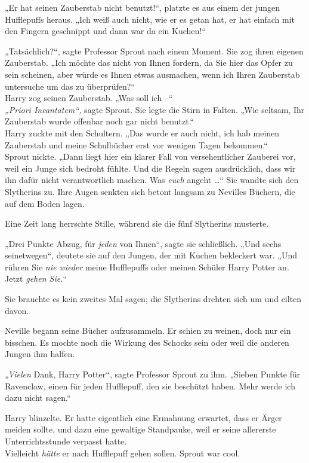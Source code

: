 {„Er hat seinen Zauberstab nicht benutzt!“, platzte es aus einem der jungen Hufflepuffs heraus. „Ich weiß auch nicht, wie er es getan hat, er hat einfach mit den Fingern geschnippt und dann war da ein Kuchen!“

„Tatsächlich?“, sagte Professor Sprout nach einem Moment. Sie zog ihren eigenen Zauberstab. „Ich möchte das nicht von Ihnen fordern, da Sie hier das Opfer zu sein scheinen, aber würde es Ihnen etwas ausmachen, wenn ich Ihren Zauberstab untersuche um das zu überprüfen?“\\ Harry zog seinen Zauberstab. „Was soll ich --“\\ \emph{„Priori Incantatem“,} sagte Sprout. Sie legte die Stirn in Falten. „Wie seltsam, Ihr Zauberstab wurde offenbar noch gar nicht benutzt.“\\ Harry zuckte mit den Schultern. „Das wurde er auch nicht, ich hab meinen Zauberstab und meine Schulbücher erst vor wenigen Tagen bekommen.“\\ Sprout nickte. „Dann liegt hier ein klarer Fall von versehentlicher Zauberei vor, weil ein Junge sich bedroht fühlte. Und die Regeln sagen ausdrücklich, dass wir ihn dafür nicht verantwortlich machen. Was \emph{euch} angeht …“ Sie wandte sich den Slytherins zu. Ihre Augen senkten sich betont langsam zu Nevilles Büchern, die auf dem Boden lagen.

Eine Zeit lang herrschte Stille, während sie die fünf Slytherins musterte.

„Drei Punkte Abzug, für \emph{jeden} von Ihnen“, sagte sie schließlich. „Und sechs seinetwegen“, deutete sie auf den Jungen, der mit Kuchen bekleckert war. „Und rühren Sie \emph{nie wieder} meine Hufflepuffs oder meinen Schüler Harry Potter an. Jetzt \emph{gehen Sie.}“

Sie brauchte es kein zweites Mal sagen; die Slytherins drehten sich um und eilten davon.

Neville begann seine Bücher aufzusammeln. Er schien zu weinen, doch nur ein bisschen. Es mochte noch die Wirkung des Schocks sein oder weil die anderen Jungen ihm halfen.

\emph{„Vielen} Dank, Harry Potter“, sagte Professor Sprout zu ihm. „Sieben Punkte für Ravenclaw, einen für jeden Hufflepuff, den sie beschützt haben. Mehr werde ich dazu nicht sagen.“

Harry blinzelte. Er hatte eigentlich eine Ermahnung erwartet, dass er Ärger meiden sollte, und dazu eine gewaltige Standpauke, weil er seine allererste Unterrichtsstunde verpasst hatte.\\ Vielleicht \emph{hätte} er nach Hufflepuff gehen sollen. Sprout war cool.

}
